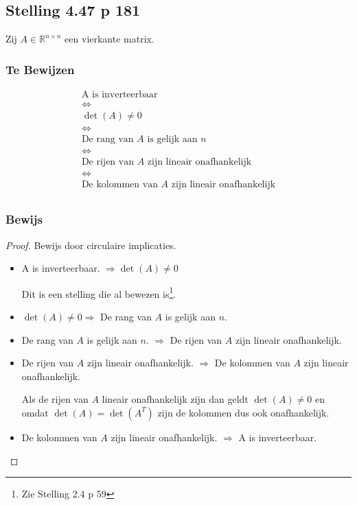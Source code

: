 \documentclass[lineaire_algebra_oplossingen.tex]{subfiles}
\begin{document}
\subsection{Stelling 4.47 p 181}
\label{4.47}
Zij $A\in \mathbb{R}^{n \times n}$ een vierkante matrix.

\subsubsection*{Te Bewijzen}
\begin{gather*}
\text{A is inverteerbaar} \\
\Leftrightarrow \\
\det(A) \neq 0 \\
\Leftrightarrow \\
\text{De rang van $A$ is gelijk aan $n$} \\
\Leftrightarrow \\
\text{De rijen van $A$ zijn lineair onafhankelijk} \\
\Leftrightarrow \\
\text{De kolommen van $A$ zijn lineair onafhankelijk} \\
\end{gather*}

\subsubsection*{Bewijs}
\begin{proof}
Bewijs door circulaire implicaties.
\begin{itemize}
\item
A is inverteerbaar. $\Rightarrow \det(A) \neq 0$

Dit is een stelling die al bewezen is\footnote{Zie Stelling 2.4 p 59}.

\item
$\det(A) \neq 0 \Rightarrow $ De rang van $A$ is gelijk aan $n$.


\item
De rang van $A$ is gelijk aan $n$. $\Rightarrow $ De rijen van $A$ zijn lineair onafhankelijk.


\item
De rijen van $A$ zijn lineair onafhankelijk. $\Rightarrow$ De kolommen van $A$ zijn lineair onafhankelijk.

Als de rijen van $A$ lineair onafhankelijk zijn dan geldt $\det(A) \neq 0$ en omdat $\det(A) = \det(A^T)$ zijn de kolommen dus ook onafhankelijk.

\item
De kolommen van $A$ zijn lineair onafhankelijk. $\Rightarrow$ A is inverteerbaar.

\end{itemize}
\end{proof}
\end{document}
